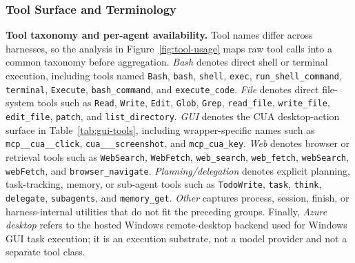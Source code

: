 \documentclass{llmxive}
\begin{document}
\subsubsection{Tool Surface and Terminology}
\label{app:tool-surface}

\noindent \textbf{Tool taxonomy and per-agent availability.}
Tool names differ across harnesses, so the analysis in Figure~\ref{fig:tool-usage} maps raw tool calls into a common taxonomy before aggregation.
\emph{Bash} denotes direct shell or terminal execution, including tools named \texttt{Bash}, \texttt{bash}, \texttt{shell}, \texttt{exec}, \texttt{run\_shell\_command}, \texttt{terminal}, \texttt{Execute}, \texttt{bash\_command}, and \texttt{execute\_code}.
\emph{File} denotes direct file-system tools such as \texttt{Read}, \texttt{Write}, \texttt{Edit}, \texttt{Glob}, \texttt{Grep}, \texttt{read\_file}, \texttt{write\_file}, \texttt{edit\_file}, \texttt{patch}, and \texttt{list\_directory}.
\emph{GUI} denotes the CUA desktop-action surface in Table~\ref{tab:gui-tools}, including wrapper-specific names such as \texttt{mcp\_\_cua\_\_click}, \texttt{cua\_\_\_screenshot}, and \texttt{mcp\_cua\_key}.
\emph{Web} denotes browser or retrieval tools such as \texttt{WebSearch}, \texttt{WebFetch}, \texttt{web\_search}, \texttt{web\_fetch}, \texttt{webSearch}, \texttt{webFetch}, and \texttt{browser\_navigate}.
\emph{Planning/delegation} denotes explicit planning, task-tracking, memory, or sub-agent tools such as \texttt{TodoWrite}, \texttt{task}, \texttt{think}, \texttt{delegate}, \texttt{subagents}, and \texttt{memory\_get}.
\emph{Other} captures process, session, finish, or harness-internal utilities that do not fit the preceding groups.
Finally, \emph{Azure desktop} refers to the hosted Windows remote-desktop backend used for Windows GUI task execution; it is an execution substrate, not a model provider and not a separate tool class.
\end{document}
